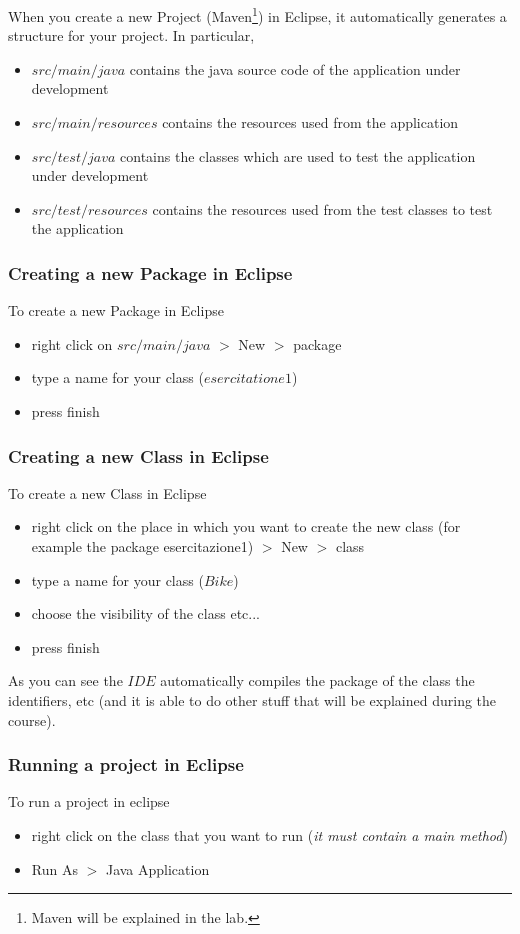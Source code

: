\documentclass{article}
\theoremstyle{definition}
\begin{document}
When you create a new Project (Maven\footnote{Maven will be explained in the lab.}) in Eclipse, it automatically generates a structure for your project. In particular, 
\begin{itemize}
\item $src/main/java$ contains the java source code of the application under development
\item $src/main/resources$ contains the resources used from the application
\item $src/test/java$ contains the classes which are used to test the application under development
\item $src/test/resources$ contains the resources used from the test classes to test the application
\end{itemize}

\subsubsection{Creating a new Package in Eclipse}
To create a new Package in Eclipse
\begin{itemize}
\item right click on $src/main/java$ $>$ New $>$ package 
\item type a name for your class ($esercitatione1$)
\item press finish
\end{itemize}

\subsubsection{Creating a new Class in Eclipse}
To create a new Class in Eclipse
\begin{itemize}
\item right click on the place in which you want to create the new class  (for example the package esercitazione1) $>$ New $>$ class 
\item type a name for your class ($Bike$)
\item choose the visibility of the class etc...
\item press finish
\end{itemize}
As you can see the $IDE$ automatically compiles the package of the class the identifiers, etc (and it is able to do other stuff that will be explained during the course).


\subsubsection{Running a project in Eclipse}
\label{sec:runningAProjectInEclipse}
To run a project in eclipse
\begin{itemize}
\item right click on the class that you want to run (\emph{it must contain a main method})
\item Run As $>$ Java Application
\end{itemize}
\end{document}

